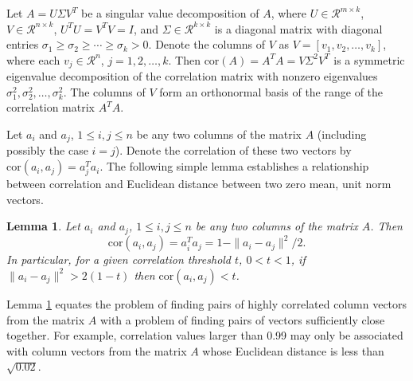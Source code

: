 \documentclass{article}
\newtheorem{lemma}[theorem]{Lemma}
\newenvironment{proof}[1][Proof]{\begin{trivlist}
\item[\hskip \labelsep {\bfseries #1}]}{\end{trivlist}}
\numberwithin{algorithmctr}{section}
\begin{document}
Let $A=U\Sigma V^T$ be a singular value decomposition of $A$, where
$U\in\mathcal{R}^{m\times k}$, $V\in\mathcal{R}^{n\times k}$,
$U^TU = V^TV = I$,
and $\Sigma\in\mathcal{R}^{k\times k}$ is a diagonal matrix with
diagonal entries $\sigma_1 \ge \sigma_2 \ge \cdots \ge \sigma_k > 0$.
Denote the columns of $V$ as $V=[v_1, v_2, \ldots, v_k]$, where each
$v_j\in\mathcal{R}^n$, $j=1,2,\ldots,k$.  Then $\mathrm{cor}(A) = A^TA =
V\Sigma^2 V^T$ is a symmetric eigenvalue decomposition of the correlation
matrix with nonzero eigenvalues $\sigma_1^2, \sigma_2^2, \ldots, \sigma_k^2$.
The columns of $V$ form an orthonormal basis of the range of the
correlation matrix $A^TA$.

Let $a_i$ and $a_j$, $1\le i,j\le n$ be any two columns of the matrix $A$
(including possibly the case $i=j$). Denote the correlation of these two
vectors by $\mathrm{cor}(a_i,a_j) = a_j^T a_i$.  The following simple lemma
establishes a relationship between correlation and Euclidean distance between
two zero mean, unit norm vectors.

\begin{lemma}
\label{distlemma}
Let $a_i$ and $a_j$, $1\le i,j\le n$ be any two columns of the matrix
$A$. Then
\begin{equation}\label{cordist}
\mathrm{cor}(a_i,a_j) = a_i^Ta_j = 1 - \|a_i - a_j\|^2/2.
\end{equation}
In particular, for a given correlation threshold $t$, $0<t<1$, if
$\|a_i - a_j\|^2 > 2(1-t)$ then
$\mathrm{cor}(a_i, a_j) < t$.
\end{lemma}

Lemma \ref{distlemma} equates the problem of finding pairs of highly correlated
column vectors from the matrix $A$ with a problem of finding pairs of vectors
sufficiently close together. For example, correlation values larger than 0.99
may only be associated with column vectors from the matrix $A$ whose Euclidean
distance is less than $\sqrt{0.02}$.
\end{document}
